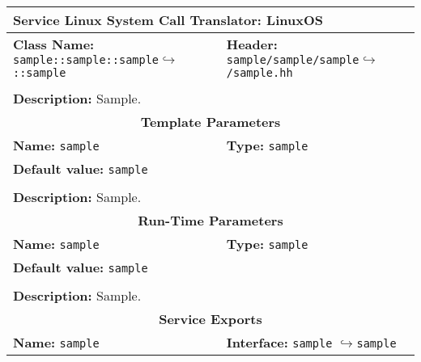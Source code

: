 \newpage
\begin{center}
	\begin{tabular}{|p{7.5cm}|p{7.5cm}|}
		\hline
		\multicolumn{2}{|l|}{\textbf{\Large Service Linux System Call Translator: LinuxOS}}\\
		\hline
		\multicolumn{1}{|p{7.5cm}}{\textbf{Class Name:} \newline \texttt{sample::sample::sample}\newline$\hookrightarrow$\texttt{::sample}} & \multicolumn{1}{p{7.5cm}|}{\textbf{Header:} \newline \texttt{sample/sample/sample}\newline$\hookrightarrow$\texttt{/sample.hh}}\\
		\multicolumn{2}{|l|}{}\\
		\multicolumn{2}{|p{15cm}|}{\textbf{Description:} \newline Sample.}\\
		\hline
		\hline
		\multicolumn{2}{|c|}{\textbf{\large Template Parameters}}\\
		\hline
		\multicolumn{1}{|p{7.5cm}}{\textbf{Name:} \texttt{sample}} & \multicolumn{1}{p{7.5cm}|}{\textbf{Type:} \texttt{sample}}\\
		\multicolumn{2}{|p{15cm}|}{\textbf{Default value:} \texttt{sample}}\\
		\multicolumn{2}{|l|}{}\\
		\multicolumn{2}{|p{15cm}|}{\textbf{Description:} \newline Sample.}\\
		\hline
		\hline
		\multicolumn{2}{|c|}{\textbf{\large Run-Time Parameters}}\\
		\hline
		\multicolumn{1}{|p{7.5cm}}{\textbf{Name:} \texttt{sample}} & \multicolumn{1}{p{7.5cm}|}{\textbf{Type:} \texttt{sample}}\\
		\multicolumn{2}{|p{15cm}|}{\textbf{Default value:} \texttt{sample}}\\
		\multicolumn{2}{|l|}{}\\
		\multicolumn{2}{|p{15cm}|}{\textbf{Description:} \newline Sample.}\\
		\hline
		\hline
		\multicolumn{2}{|c|}{\textbf{\large Service Exports}}\\
		\hline
		\multicolumn{1}{|p{7.5cm}}{\textbf{Name:} \texttt{sample}} & \multicolumn{1}{p{7.5cm}|}{\textbf{Interface:} \newline \texttt{sample} \newline$\hookrightarrow$\texttt{sample}}\\

\end{tabular}
\end{center}
